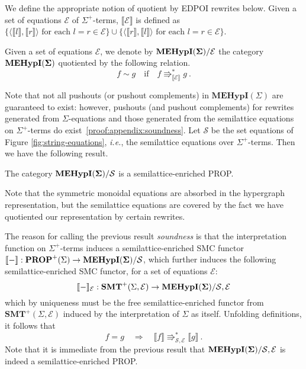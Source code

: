 We define the appropriate notion of quotient by EDPOI rewrites below.  
Given a set of equations $\mathcal{E}$ of $\Sigma^{+}$-terms, $\llbracket \mathcal{E} \rrbracket$ is defined as $\{\langle \llbracket l \rrbracket, \llbracket r \rrbracket \rangle \text{ for each } l = r \in \mathcal{E} \} \cup \{\langle \llbracket r \rrbracket, \llbracket l \rrbracket \rangle \text{ for each } l = r \in \mathcal{E}\}$.
\begin{definition}  
Given a set of equations $\mathcal{E}$,  we denote by ${\mathbf{MEHypI(\Sigma)}}/\mathcal{E}$ the category ${\mathbf{MEHypI(\Sigma)}}$ quotiented by the following relation. 
\[
	f \sim g \quad \text{if} \quad f \Rrightarrow^{*}_{\llbracket \mathcal E \rrbracket} g ~ . 
\]
\end{definition}

Note that not all pushouts (or pushout complements) in $\textbf{MEHypI}(\Sigma)$ are guaranteed to exist: however,  pushouts (and pushout complements) for rewrites generated from $\Sigma$-equations and those generated from the semilattice equations on $\Sigma^+$-terms do exist~\ref{proof:appendix:soundness}.
Let $\mathcal{S}$ be the set equations of Figure \ref{fig:string-equations},  \textit{i.e.},  the semilattice equations over $\Sigma^+$-terms. 
Then we have the following result. 
\begin{proposition}[Soundness]
\label{prop:soundness}
The category ${\mathbf{MEHypI(\Sigma)}}/{\mathcal{S}}$ is a semilattice-enriched PROP. 
\end{proposition}
Note that the symmetric monoidal equations are absorbed in the hypergraph representation,  but the semilattice equations are covered by the fact we have quotiented our representation by certain rewrites. 

The reason for calling the previous result \textit{soundness} is that the interpretation function on $\Sigma^+$-terms induces a semilattice-enriched SMC functor $\llbracket - \rrbracket: \textbf{PROP}^+(\Sigma) \to {\mathbf{MEHypI(\Sigma)}}/{\mathcal{S}}$,  which further induces the following semilattice-enriched SMC functor,  for a set of equations $\mathcal E$:
\[
	\llbracket - \rrbracket_{\mathcal E}: \textbf{SMT}^+(\Sigma, \mathcal E) \to {\mathbf{MEHypI(\Sigma)}}/{\mathcal{S,E}}
\]
which by uniqueness must be the free semilattice-enriched functor from $\textbf{SMT}^+(\Sigma, \mathcal E)$ induced by the interpretation of $\Sigma$ as itself.  Unfolding definitions,  it follows that
\[
	f = g \quad \Rightarrow \quad \llbracket f \rrbracket \Rrightarrow^{*}_{\mathcal{S}, \mathcal{E}} \llbracket g \rrbracket~ . 
\]
Note that it is immediate from the previous result that ${\mathbf{MEHypI(\Sigma)}}/{\mathcal{S,E}}$ is indeed a semilattice-enriched PROP.  

